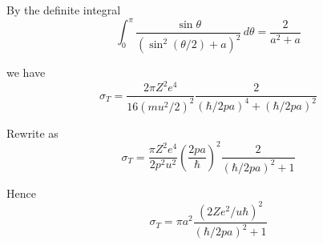 By the definite integral
\begin{equation*}
\int_0^\pi\frac{\sin\theta}{\left(\sin^2(\theta/2)+a\right)^2}\,d\theta=\frac{2}{a^2+a}
\end{equation*}

we have
\begin{equation*}
\sigma_T=\frac{2\pi Z^2e^4}{16(mu^2/2)^2}
\frac{2}{(\hbar/2pa)^4+(\hbar/2pa)^2}
\end{equation*}

Rewrite as
\begin{equation*}
\sigma_T=\frac{\pi Z^2e^4}{2p^2u^2}
\left(\frac{2pa}{\hbar}\right)^2
\frac{2}{(\hbar/2pa)^2+1}
\end{equation*}

Hence
\begin{equation*}
\sigma_T=\pi a^2\frac{(2Ze^2/u\hbar)^2}{(\hbar/2pa)^2+1}
\end{equation*}


